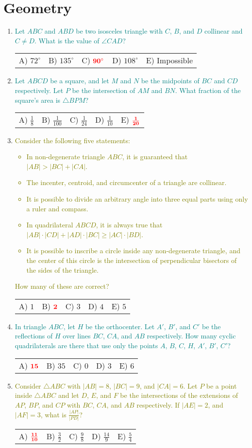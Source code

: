 \documentclass{article}
\newcommand{\answers}[5]{
    \newline
    {
        \centering
        \begin{tabular}{p{0.15\textwidth} p{0.15\textwidth} p{0.15\textwidth} p{0.15\textwidth} p{0.15\textwidth}}
            A) #1 & B) #2 & C) #3 & D) #4 & E) #5
        \end{tabular}
    }
}
\newcommand{\correct}[1]{
    \mathbf{\textcolor{red}{#1}}
}
\newcommand{\mustintermediate}[1]{
    \textcolor{teal}{#1}
}
\newcommand{\canadvanced}[1]{
    \textcolor{olive}{#1}
}
\begin{document}
\section{Geometry}
\begin{enumerate}[1.]

\item %
\mustintermediate{Let $ABC$ and $ABD$ be two isosceles triangle with $C$, $B$, and $D$ collinear and $C \ne D$.
What is the value of $\angle CAD$?}
\answers{$72^\circ$}{$135^\circ$}{$\correct{90^\circ}$}{$108^\circ$}{Impossible}


\item %
\mustintermediate{Let $ABCD$ be a square, and let $M$ and $N$ be the midpoints of $BC$ and $CD$ respectively.
Let $P$ be the intersection of $AM$ and $BN$.
What fraction of the square's area is $\triangle BPM$?}
\answers{ $\frac{1}{8}$ }{ $\frac{1}{100}$ }{ $\frac{1}{24}$ }{ $\frac{1}{10}$ }{ $\correct{\frac{1}{20}}$ }


\item %
\canadvanced{Consider the following five statements:
\begin{itemize}
    \item In non-degenerate triangle $ABC$, it is guaranteed that $|AB| > |BC| + |CA|$.
    \item The incenter, centroid, and circumcenter of a triangle are collinear.
    \item It is possible to divide an arbitrary angle into three equal parts using only a ruler and compass.
    \item In quadrilateral $ABCD$, it is always true that $|AB| \cdot |CD| + |AD| \cdot |BC| \ge |AC| \cdot |BD|$.
    \item It is possible to inscribe a circle inside any non-degenerate triangle, and the center of this circle is the intersection of perpendicular bisectors of the sides of the triangle.
\end{itemize}
How many of these are correct?}
\answers{$1$}{$\correct{2}$}{$3$}{$4$}{$5$}

\item %
\mustintermediate{In triangle $ABC$, let $H$ be the orthocenter.
Let $A'$, $B'$, and $C'$ be the reflections of $H$ over lines $BC$, $CA$, and $AB$ respectively.
How many cyclic quadrilaterals are there that use only the points $A$, $B$, $C$, $H$, $A'$, $B'$, $C'$?}
\answers{$\correct{15}$}{$35$}{$0$}{$3$}{$6$}


\item %
\canadvanced{Consider $\triangle ABC$ with $|AB| = 8$, $|BC| = 9$, and $|CA| = 6$.
Let $P$ be a point inside $\triangle ABC$ and let $D$, $E$, and $F$ be the intersections of the extensions of $AP$, $BP$, and $CP$ with $BC$, $CA$, and $AB$ respectively.
If $|AE| = 2$, and $|AF| = 3$, what is $\frac{|AP|}{|PD|}$?}
\answers{ $\correct{\frac{11}{10}}$ }{ $\frac{3}{2}$ }{ $\frac{9}{8}$ }{ $\frac{14}{9}$ }{ $\frac{5}{4}$ }

\end{enumerate}
\end{document}
